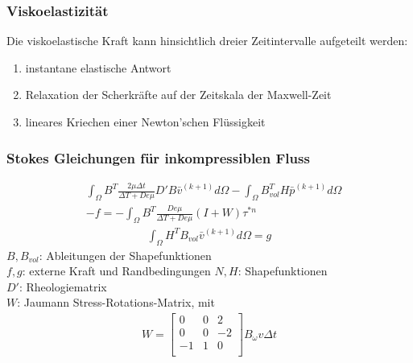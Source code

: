 \documentclass{beamer}
\begin{document}
 \begin{frame}
 \frametitle{Viskoelastizität}
 Die viskoelastische Kraft kann hinsichtlich dreier Zeitintervalle aufgeteilt werden:
 \begin{enumerate}
 	\item instantane elastische Antwort
 	\item Relaxation der Scherkräfte auf der Zeitskala der Maxwell-Zeit
 	\item lineares Kriechen einer Newton'schen Flüssigkeit
 \end{enumerate}

\end{frame}



\begin{frame}
	\frametitle{Stokes Gleichungen für inkompressiblen Fluss}
		\begin{align*}
			&\int_{\Omega} B^T \frac{2\mu \Delta t}{\Delta T + De\mu} D' B \bar{v}^{(k+1)} d\Omega -  \int_{\Omega} B^T_{vol} H \bar{p}^{(k+1)} d\Omega \\ 
			&-f  = -\int_{\Omega} B^T \frac{De\mu}{\Delta T + De\mu}(I+W)\tau^{*n}
		\end{align*}
		\begin{align*}
			\int_{\Omega} H^T B_{vol}  \bar{v}^{(k+1)} d\Omega = g
		\end{align*}
	$B, B_{vol}$: Ableitungen der Shapefunktionen \\
	$f, g$: externe Kraft und Randbedingungen
	$N,H$: Shapefunktionen\\
	$D'$: Rheologiematrix \\
	$W$: Jaumann Stress-Rotations-Matrix, mit 
	\begin{align*}
		W = 	\begin{bmatrix}
				0 & 0 & 2 \\
				0 & 0 & -2 \\
				-1 & 1 & 0 \\
				\end{bmatrix}
				B_{\omega} v \Delta t
	\end{align*}
\end{frame}
\end{document}
